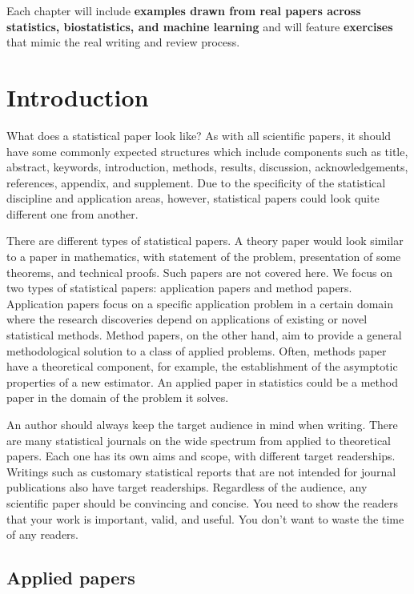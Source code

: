\documentclass[
]{book}
\theoremstyle{definition}
\theoremstyle{definition}
\theoremstyle{definition}
\theoremstyle{definition}
\theoremstyle{remark}
\begin{document}
Each chapter will include \textbf{examples drawn from real papers across statistics, biostatistics, and machine learning} and will feature \textbf{exercises} that mimic the real writing and review process.

\chapter{Introduction}\label{introduction}

What does a statistical paper look like? As with all scientific papers, it
should have some commonly expected structures which include components such as
title, abstract, keywords, introduction, methods, results, discussion,
acknowledgements, references, appendix, and supplement. Due to the
specificity of the statistical discipline and application areas, however,
statistical papers could look quite different one from another.

There are different types of statistical papers. A theory paper would look
similar to a paper in mathematics, with statement of the problem, presentation
of some theorems, and technical proofs. Such papers are not covered here. We
focus on two types of statistical papers: application papers and method papers.
Application papers focus on a specific application problem in a certain domain
where the research discoveries depend on applications of existing or novel
statistical methods. Method papers, on the other hand, aim to provide a general
methodological solution to a class of applied problems. Often, methods
paper have a theoretical component, for example, the establishment of the
asymptotic properties of a new estimator. An applied paper in statistics could
be a method paper in the domain of the problem it solves.

An author should always keep the target audience in mind when writing. There are
many statistical journals on the wide spectrum from applied to theoretical
papers. Each one has its own aims and scope, with different target
readerships. Writings such as customary statistical reports that are not
intended for journal publications also have target readerships. Regardless of
the audience, any scientific paper should be convincing and concise. You need to
show the readers that your work is important, valid, and useful. You don't want
to waste the time of any readers.

\section{Applied papers}\label{applied-papers-1}
\end{document}
